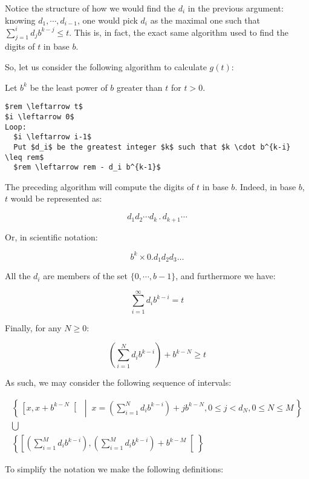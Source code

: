\documentclass[11pt, reqno]{amsart}
\begin{document}
\bigskip

Notice the structure of how we would find the $d_i$ in the previous argument: knowing $d_1, \cdots, d_{i-1}$, one would pick $d_i$ as the maximal one such that $\sum_{j = 1}^i d_j b^{k-j} \leq t$. This is, in fact, the exact same algorithm used to find the digits of $t$ in base $b$.

So, let us consider the following algorithm to calculate $g(t)$:

Let $b^k$ be the least power of $b$ greater than $t$ for $t > 0$.

\begin{lstlisting}
$rem \leftarrow t$
$i \leftarrow 0$
Loop:
  $i \leftarrow i-1$
  Put $d_i$ be the greatest integer $k$ such that $k \cdot b^{k-i} \leq rem$
  $rem \leftarrow rem - d_i b^{k-1}$
\end{lstlisting}
\label{digalg}

The preceding algorithm will compute the digits of $t$ in base $b$. Indeed, in base $b$, $t$ would be represented as:

\[d_1 d_2 \cdots d_k \, . \, d_{k+1} \cdots\]

Or, in scientific notation:

\[b^k \times 0.d_1 d_2 d_3 \dots\]

All the $d_i$ are members of the set $\{ 0, \cdots, b-1\}$, and furthermore we have:

\[\sum_{i = 1}^\infty d_i b^{k-i} = t\]

Finally, for any $N \geq 0$:

\[(\sum_{i=1}^N d_i b^{k-i}) + b^{k-N} \geq t\]

As such, we may consider the following sequence of intervals:

\begin{gather*}
\left\{\, \left[ x , x + b^{k-N} \right[ \;\middle|\; x = \left(\sum_{i=1}^N d_i b^{k-i}\right) + j b^{k-N}, 0 \leq j < d_N, 0 \leq N \leq M\,\right\}\\
\bigcup\\
\left\{\left[ \left(\sum_{i=1}^M d_i b^{k-i}\right) ,\left(\sum_{i=1}^M d_i b^{k-i}\right) + b^{k-M} \right[\right\}
\end{gather*}

To simplify the notation we make the following definitions:
\end{document}
